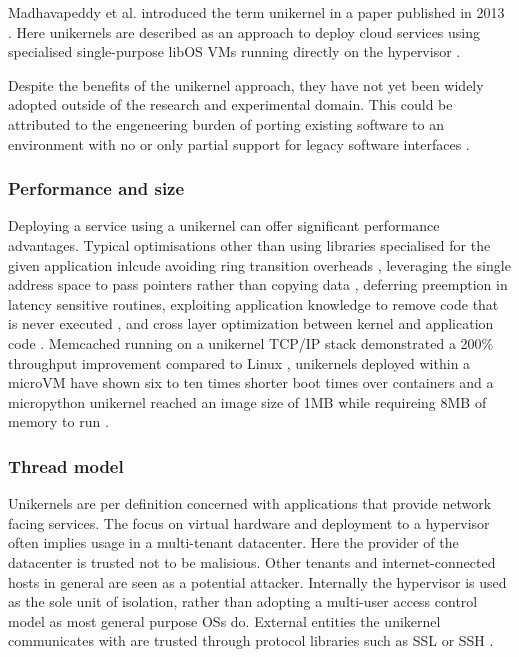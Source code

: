 \documentclass[10pt,twocolumn,a4paper]{article}
\begin{document}
    Madhavapeddy et al. introduced the term unikernel in a paper 
    published in 2013 \cite{madhavapeddy13}.
    Here unikernels are described as an approach to deploy cloud services
    using specialised single-purpose libOS VMs running directly 
    on the hypervisor \cite{madhavapeddy13}.

    Despite the benefits of the unikernel approach, they have not yet been widely adopted
    outside of the research and experimental domain.
    This could be attributed to the engeneering burden of porting existing software
    to an environment with no or only partial support for legacy software interfaces \cite{raza19}.
    
    \subsubsection{Performance and size}
      Deploying a service using a unikernel can offer significant
      performance advantages.
      Typical optimisations other than using libraries specialised for the given
      application inlcude avoiding ring transition overheads \cite{maeda2003},
      leveraging the single address space to pass pointers rather than copying data \cite {schatzberg16},
      deferring preemption in latency sensitive routines,
      exploiting application knowledge to remove code that is never executed \cite{madhavapeddy13},
      and cross layer optimization between kernel and application code \cite{raza19}.
      Memcached running on a unikernel TCP/IP stack
      demonstrated a 200\% throughput improvement compared to Linux \cite{schatzberg16},
      unikernels deployed within a microVM have shown six to ten times shorter
      boot times over containers \cite{koller17} and a micropython unikernel reached an image
      size of 1MB while requireing 8MB of memory to run \cite{manco17}.

    \subsubsection{Thread model}
      Unikernels are per definition concerned with applications that provide network
      facing services. 
      The focus on virtual hardware and deployment to a hypervisor
      often implies usage in a multi-tenant datacenter.
      Here the provider of the datacenter is trusted not to be malisious.
      Other tenants and internet-connected hosts in general are seen as 
      a potential attacker.
      Internally the hypervisor is used as the sole unit of isolation, 
      rather than adopting a multi-user access control model as most general purpose OSs do.
      External entities the unikernel communicates with are trusted through
      protocol libraries such as SSL or SSH \cite{madhavapeddy13}.
\end{document}
